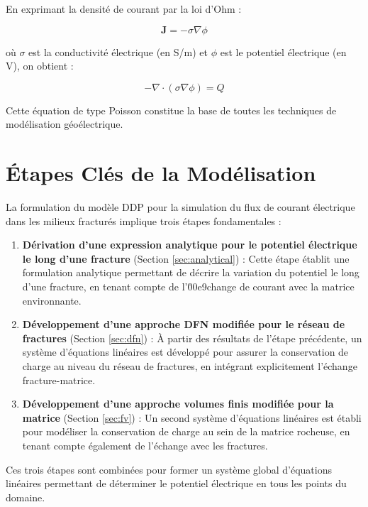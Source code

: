 En exprimant la densité de courant par la loi d'Ohm :

\begin{equation}
\mathbf{J} = -\sigma \nabla \phi
\label{eq:ohm_law}
\end{equation}

où $\sigma$ est la conductivité électrique (en S/m) et $\phi$ est le potentiel électrique (en V), on obtient :

\begin{equation}
-\nabla \cdot (\sigma \nabla \phi) = Q
\label{eq:poisson}
\end{equation}

Cette équation de type Poisson constitue la base de toutes les techniques de modélisation géoélectrique.

\section{Étapes Clés de la Modélisation}
\label{sec:steps}

La formulation du modèle DDP pour la simulation du flux de courant électrique dans les milieux fracturés implique trois étapes fondamentales :

\begin{enumerate}
    \item \textbf{Dérivation d'une expression analytique pour le potentiel électrique le long d'une fracture} (Section \ref{sec:analytical}) : Cette étape établit une formulation analytique permettant de décrire la variation du potentiel le long d'une fracture, en tenant compte de l'\u00e9change de courant avec la matrice environnante.
    
    \item \textbf{Développement d'une approche DFN modifiée pour le réseau de fractures} (Section \ref{sec:dfn}) : À partir des résultats de l'étape précédente, un système d'équations linéaires est développé pour assurer la conservation de charge au niveau du réseau de fractures, en intégrant explicitement l'échange fracture-matrice.
    
    \item \textbf{Développement d'une approche volumes finis modifiée pour la matrice} (Section \ref{sec:fv}) : Un second système d'équations linéaires est établi pour modéliser la conservation de charge au sein de la matrice rocheuse, en tenant compte également de l'échange avec les fractures.
\end{enumerate}

Ces trois étapes sont combinées pour former un système global d'équations linéaires permettant de déterminer le potentiel électrique en tous les points du domaine.

